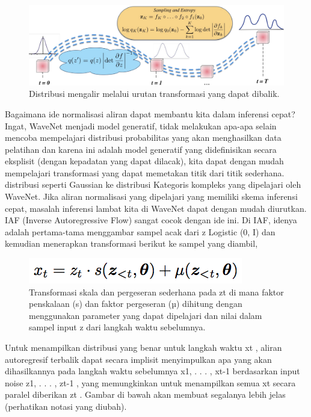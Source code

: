 \begin{figure}[H]
        \centerline{\includegraphics[scale=.25]{figures/rumus11}}
        \caption{Distribusi mengalir melalui urutan transformasi yang dapat dibalik.}
		\label{rumus11}
\end{figure}
Bagaimana ide normalisasi aliran dapat membantu kita dalam inferensi cepat? Ingat, WaveNet menjadi model generatif, tidak melakukan apa-apa selain mencoba mempelajari distribusi probabilitas yang akan menghasilkan data pelatihan dan karena ini adalah model generatif yang didefinisikan secara eksplisit (dengan kepadatan yang dapat dilacak), kita dapat dengan mudah mempelajari transformasi yang dapat memetakan titik dari titik sederhana. distribusi seperti Gaussian ke distribusi Kategoris kompleks yang dipelajari oleh WaveNet. Jika aliran normalisasi yang dipelajari yang memiliki skema inferensi cepat, masalah inferensi lambat kita di WaveNet dapat dengan mudah diurutkan. IAF (Inverse Autoregressive Flow) sangat cocok dengan ide ini.
Di IAF, idenya adalah pertama-tama menggambar sampel acak dari z Logistic (0, I) dan kemudian menerapkan transformasi berikut ke sampel yang diambil,
\begin{figure}[H]
        \centerline{\includegraphics[scale=.5]{figures/rumus12}}
        \caption{Transformasi skala dan pergeseran sederhana pada zt di mana faktor penskalaan (s) dan faktor pergeseran (µ) dihitung dengan menggunakan parameter yang dapat dipelajari dan nilai dalam sampel input z dari langkah waktu sebelumnya.}
		\label{rumus12}
\end{figure}
Untuk menampilkan distribusi yang benar untuk langkah waktu xt , aliran autoregresif terbalik dapat secara implisit menyimpulkan apa yang akan dihasilkannya pada langkah waktu sebelumnya x1, . . . , xt-1 berdasarkan input noise z1, . . . , zt-1 , yang memungkinkan untuk menampilkan semua xt secara paralel diberikan zt . Gambar di bawah akan membuat segalanya lebih jelas (perhatikan notasi yang diubah).
